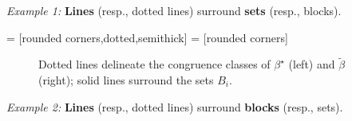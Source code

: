 \documentclass{amsart}
\begin{document}

\bigskip

{\it Example 1:} 
    {\bf Lines} (resp., dotted lines) surround {\bf sets} (resp., blocks).

     = [rounded corners,dotted,semithick]
     = [rounded corners]

    \newcommand{\mycaption}{Dotted lines delineate the congruence classes
      of $\beta^\star$ (left) and $\tbeta$ (right); solid lines surround the sets $B_i$.}

    \newcommand{\tbeta}{\ensuremath{\widetilde{\beta}}}
    \newcommand{\ttheta}{\ensuremath{\widetilde{\theta}}}
    \newcommand{\hbeta}{\ensuremath{\widehat{\beta}}}


\begin{figure}[h]
  \centering
      {
        \hskip1cm
      }
      \caption{\mycaption}
\end{figure}


{\it Example 2:} 
    {\bf Lines} (resp., dotted lines) surround {\bf blocks} (resp., sets).
\end{document}
